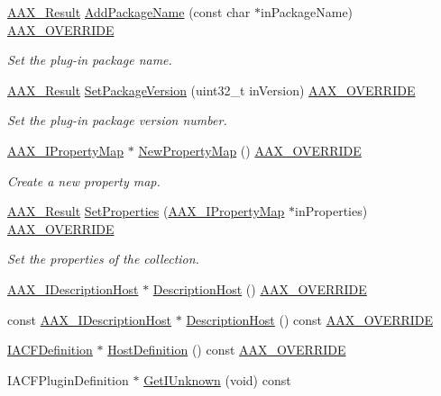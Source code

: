 \begin{DoxyCompactItemize}
\mbox{\hyperlink{a00392_a4d8f69a697df7f70c3a8e9b8ee130d2f}{A\+A\+X\+\_\+\+Result}} \mbox{\hyperlink{a01897_a20f5240a6e7c3f6b787fc6f6040f2258}{Add\+Package\+Name}} (const char $\ast$in\+Package\+Name) \mbox{\hyperlink{a00392_ac2f24a5172689ae684344abdcce55463}{A\+A\+X\+\_\+\+O\+V\+E\+R\+R\+I\+DE}}
\begin{DoxyCompactList}\small\item\em Set the plug-\/in package name. \end{DoxyCompactList}\item 
\mbox{\hyperlink{a00392_a4d8f69a697df7f70c3a8e9b8ee130d2f}{A\+A\+X\+\_\+\+Result}} \mbox{\hyperlink{a01897_a8c070ce17b8af89de1fbf543d746635c}{Set\+Package\+Version}} (uint32\+\_\+t in\+Version) \mbox{\hyperlink{a00392_ac2f24a5172689ae684344abdcce55463}{A\+A\+X\+\_\+\+O\+V\+E\+R\+R\+I\+DE}}
\begin{DoxyCompactList}\small\item\em Set the plug-\/in package version number. \end{DoxyCompactList}\item 
\mbox{\hyperlink{a01869}{A\+A\+X\+\_\+\+I\+Property\+Map}} $\ast$ \mbox{\hyperlink{a01897_a564f2e0d4530e17e135c7b011c9bd3d8}{New\+Property\+Map}} () \mbox{\hyperlink{a00392_ac2f24a5172689ae684344abdcce55463}{A\+A\+X\+\_\+\+O\+V\+E\+R\+R\+I\+DE}}
\begin{DoxyCompactList}\small\item\em Create a new property map. \end{DoxyCompactList}\item 
\mbox{\hyperlink{a00392_a4d8f69a697df7f70c3a8e9b8ee130d2f}{A\+A\+X\+\_\+\+Result}} \mbox{\hyperlink{a01897_a08afb5e984bac10864366e0f356ff687}{Set\+Properties}} (\mbox{\hyperlink{a01869}{A\+A\+X\+\_\+\+I\+Property\+Map}} $\ast$in\+Properties) \mbox{\hyperlink{a00392_ac2f24a5172689ae684344abdcce55463}{A\+A\+X\+\_\+\+O\+V\+E\+R\+R\+I\+DE}}
\begin{DoxyCompactList}\small\item\em Set the properties of the collection. \end{DoxyCompactList}\item 
\mbox{\hyperlink{a01793}{A\+A\+X\+\_\+\+I\+Description\+Host}} $\ast$ \mbox{\hyperlink{a01897_a6d76c238644027f8622618d3e5cc4e44}{Description\+Host}} () \mbox{\hyperlink{a00392_ac2f24a5172689ae684344abdcce55463}{A\+A\+X\+\_\+\+O\+V\+E\+R\+R\+I\+DE}}
\item 
const \mbox{\hyperlink{a01793}{A\+A\+X\+\_\+\+I\+Description\+Host}} $\ast$ \mbox{\hyperlink{a01897_ac26e17d7bd1ec4be3bd178fdd0ff9be6}{Description\+Host}} () const \mbox{\hyperlink{a00392_ac2f24a5172689ae684344abdcce55463}{A\+A\+X\+\_\+\+O\+V\+E\+R\+R\+I\+DE}}
\item 
\mbox{\hyperlink{a01413}{I\+A\+C\+F\+Definition}} $\ast$ \mbox{\hyperlink{a01897_a9ca97f39ce8e458da67a4c1f4a7a7a4b}{Host\+Definition}} () const \mbox{\hyperlink{a00392_ac2f24a5172689ae684344abdcce55463}{A\+A\+X\+\_\+\+O\+V\+E\+R\+R\+I\+DE}}
\item 
I\+A\+C\+F\+Plugin\+Definition $\ast$ \mbox{\hyperlink{a01897_ae4e62289bf77a6bf9ac23de10fc3a299}{Get\+I\+Unknown}} (void) const
\end{DoxyCompactItemize}



